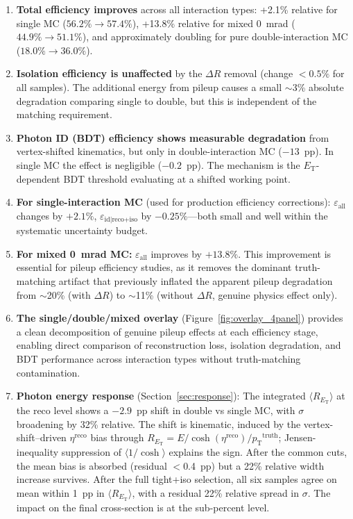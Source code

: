 \documentclass[11pt,letterpaper]{article}
\newcommand{\DR}{\ensuremath{\Delta R}}
\newcommand{\pT}{\ensuremath{p_{\text{T}}}}
\newcommand{\ET}{\ensuremath{E_{\text{T}}}}
\newcommand{\eid}{\ensuremath{\varepsilon_{\text{id}|\text{reco+iso}}}}
\newcommand{\eall}{\ensuremath{\varepsilon_{\text{all}}}}
\begin{document}
\begin{enumerate}
  \item \textbf{Total efficiency improves} across all interaction types:
    +2.1\% relative for single MC ($56.2\% \to 57.4\%$), +13.8\% relative
    for mixed 0~mrad ($44.9\% \to 51.1\%$), and approximately doubling for
    pure double-interaction MC ($18.0\% \to 36.0\%$).

  \item \textbf{Isolation efficiency is unaffected} by the $\DR$ removal
    (change $< 0.5\%$ for all samples). The additional energy from pileup
    causes a small $\sim$3\% absolute degradation comparing single to double,
    but this is independent of the matching requirement.

  \item \textbf{Photon ID (BDT) efficiency shows measurable degradation}
    from vertex-shifted kinematics, but only in double-interaction MC
    ($-13$~pp). In single MC the effect is negligible ($-0.2$~pp). The
    mechanism is the \ET-dependent BDT threshold evaluating at a shifted
    working point.

  \item \textbf{For single-interaction MC} (used for production efficiency
    corrections): $\eall$ changes by $+2.1\%$, $\eid$ by $-0.25\%$---both
    small and well within the systematic uncertainty budget.

  \item \textbf{For mixed 0~mrad MC:} $\eall$ improves by $+13.8\%$. This
    improvement is essential for pileup efficiency studies, as it removes the
    dominant truth-matching artifact that previously inflated the
    apparent pileup degradation from $\sim$20\% (with $\DR$) to $\sim$11\%
    (without $\DR$, genuine physics effect only).

  \item \textbf{The single/double/mixed overlay} (Figure~\ref{fig:overlay_4panel})
    provides a clean decomposition of genuine pileup effects at each efficiency
    stage, enabling direct comparison of reconstruction loss, isolation
    degradation, and BDT performance across interaction types without
    truth-matching contamination.

  \item \textbf{Photon energy response} (Section~\ref{sec:response}):
    The integrated $\langle R_{\ET}\rangle$ at the reco level shows a
    $-2.9$~pp shift in double vs single MC, with $\sigma$ broadening by
    32\% relative. The shift is kinematic, induced by the vertex-shift--driven
    $\eta^{\text{reco}}$ bias through $R_{\ET} = E/\cosh(\eta^{\text{reco}}) /
    \pT^{\text{truth}}$; Jensen-inequality suppression of $\langle 1/\cosh\rangle$
    explains the sign. After the common cuts, the mean bias is absorbed
    (residual $<$0.4~pp) but a 22\% relative width increase survives.
    After the full tight+iso selection, all six samples agree on mean
    within 1~pp in $\langle R_{\ET}\rangle$, with a residual 22\% relative
    spread in $\sigma$. The impact on the final cross-section is at the
    sub-percent level.


\end{enumerate}
\end{document}
